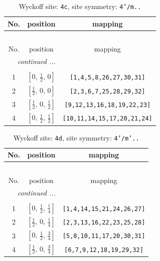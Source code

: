 \documentclass[fleqn,8pt]{jsarticle}
\begin{document}
\renewcommand{\arraystretch}{1.2}
\begin{longtable}{ccc}
\caption{Wyckoff site: {\tt 4c}, site symmetry: {\tt 4'/m..}}
 \\
 \hline \hline
No. & position & mapping \\ \hline \endfirsthead

\multicolumn{2}{l}{\tablename\ \thetable{}} \\
 \hline \hline
No. & position & mapping \\ \hline \endhead

 \hline \hline
\multicolumn{2}{r}{\footnotesize\it continued ...} \\ \endfoot

 \hline \hline
\multicolumn{2}{r}{} \\ \endlastfoot

1 & $\left[ 0,\, \frac{1}{2},\, 0 \right]$ & {\tt [1,4,5,8,26,27,30,31]} \\ \hline
2 & $\left[ \frac{1}{2},\, 0,\, 0 \right]$ & {\tt [2,3,6,7,25,28,29,32]} \\ \hline
3 & $\left[ \frac{1}{2},\, 0,\, \frac{1}{2} \right]$ & {\tt [9,12,13,16,18,19,22,23]} \\ \hline
4 & $\left[ 0,\, \frac{1}{2},\, \frac{1}{2} \right]$ & {\tt [10,11,14,15,17,20,21,24]} \\
\end{longtable}
\renewcommand{\arraystretch}{1.2}
\begin{longtable}{ccc}
\caption{Wyckoff site: {\tt 4d}, site symmetry: {\tt 4'/m'..}}
 \\
 \hline \hline
No. & position & mapping \\ \hline \endfirsthead

\multicolumn{2}{l}{\tablename\ \thetable{}} \\
 \hline \hline
No. & position & mapping \\ \hline \endhead

 \hline \hline
\multicolumn{2}{r}{\footnotesize\it continued ...} \\ \endfoot

 \hline \hline
\multicolumn{2}{r}{} \\ \endlastfoot

1 & $\left[ 0,\, \frac{1}{2},\, \frac{1}{4} \right]$ & {\tt [1,4,14,15,21,24,26,27]} \\ \hline
2 & $\left[ \frac{1}{2},\, 0,\, \frac{1}{4} \right]$ & {\tt [2,3,13,16,22,23,25,28]} \\ \hline
3 & $\left[ 0,\, \frac{1}{2},\, \frac{3}{4} \right]$ & {\tt [5,8,10,11,17,20,30,31]} \\ \hline
4 & $\left[ \frac{1}{2},\, 0,\, \frac{3}{4} \right]$ & {\tt [6,7,9,12,18,19,29,32]} \\
\end{longtable}
\end{document}
